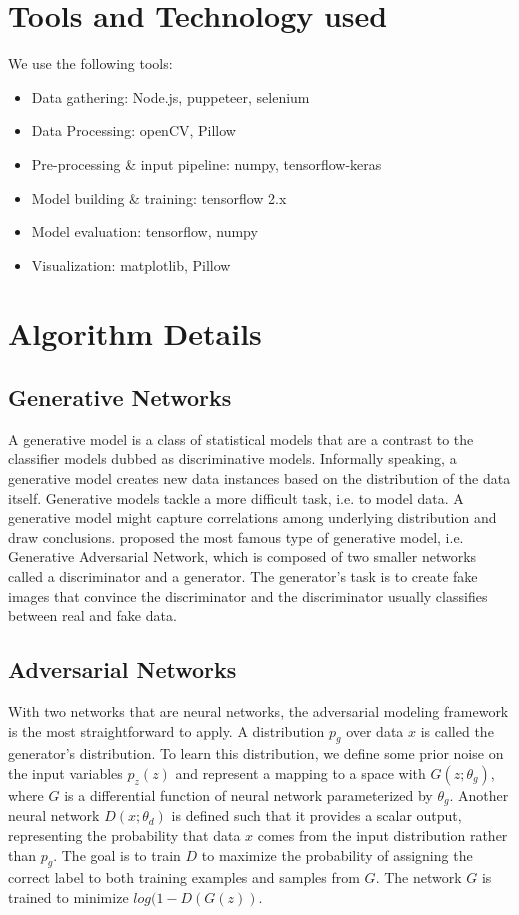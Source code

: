 \documentclass[oneside,a4paper,12pt]{report}
\begin{document}
\section{Tools and Technology used}
\hspace*{0.25 in}We use the following tools:
\begin{itemize}
	\item Data gathering: Node.js, puppeteer, selenium
	\item Data Processing: openCV, Pillow
	\item Pre-processing \& input pipeline: numpy, tensorflow-keras
	\item Model building \& training: tensorflow 2.x
	\item Model evaluation: tensorflow, numpy
	\item Visualization: matplotlib, Pillow
\end{itemize}

\section{Algorithm Details}
\subsection{Generative Networks}
\hspace*{0.25 in}A generative model is a class of statistical models that are a contrast to the classifier models dubbed as discriminative models. Informally speaking, a generative model creates new data instances based on the distribution of the data itself. Generative models tackle a more difficult task, i.e. to model data. A generative model might capture correlations among underlying distribution and draw conclusions. \cite{goodfellow2014generative} proposed the most famous type of generative model, i.e. Generative Adversarial Network, which is composed of two smaller networks called a discriminator and a generator. The generator's task is to create fake images that convince the discriminator and the discriminator usually classifies between real and fake data. 
\subsection{Adversarial Networks}
\hspace*{0.25 in}With two networks that are neural networks, the adversarial modeling framework is the most straightforward to apply. A distribution $p_g$ over data $x$ is called the generator's distribution. To learn this distribution, we define some prior noise on the input variables $p_z(z)$ and represent a mapping to a space with $G(z; \theta_g)$, where $G$ is a differential function of neural network parameterized by $\theta_g$. Another neural network $D(x;\theta_d)$ is defined such that it provides a scalar output, representing the probability that data $x$ comes from the input distribution rather than $p_g$. The goal is to train $D$ to maximize the probability of assigning the correct label to both training examples and samples from $G$. The network $G$ is trained to minimize $log(1-D(G(z))$. 
\end{document}
